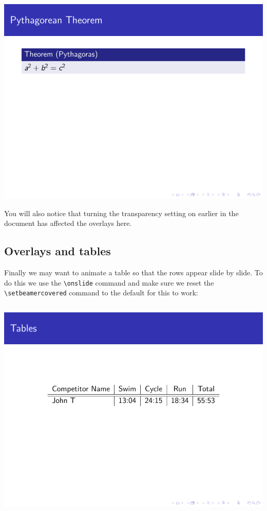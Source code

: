 \begin{column}{0.5\textwidth}
\includegraphics[page=2]{examples/beamer/overlay-environment.pdf}

You will also notice that turning the transparency setting on earlier in the document has affected the overlays here.

\subsection{Overlays and tables}

Finally we may want to animate a table so that the rows appear slide by slide. To do this we use the \verb|\onslide| command and make sure we reset the \verb|\setbeamercovered| command to the default for this to work:

\inputminted[linenos=true]{latex}{examples/beamer/overlay-table.tex}

\includegraphics[page=1]{examples/beamer/overlay-table.pdf}


\end{column}
